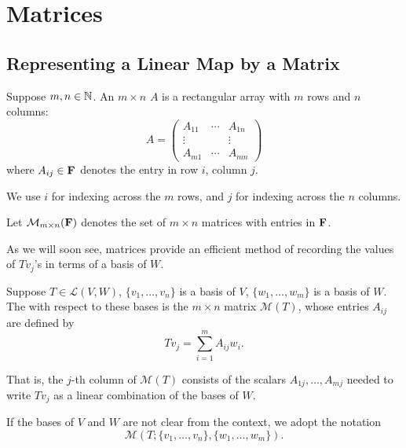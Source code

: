 \section{Matrices}
\subsection{Representing a Linear Map by a Matrix}
\begin{definition}[Matrix]
Suppose $m,n\in\mathbb N$. An $m\times n$  $A$ is a rectangular array with $m$ rows and $n$ columns:
\[A=\begin{pmatrix}
A_{11} & \cdots & A_{1n}\\
\vdots & & \vdots\\
A_{m1} & \cdots & A_{mn}
\end{pmatrix}\]
where $A_{ij}\in\mathbf F$ denotes the entry in row $i$, column $j$.
\end{definition}

\begin{notation}
We use $i$ for indexing across the $m$ rows, and $j$ for indexing across the $n$ columns.
\end{notation}

Let $\mathcal{M}_{m\times n}(\mathbf F)$ denotes the set of $m\times n$ matrices with entries in $\mathbf F$.

As we will soon see, matrices provide an efficient method of recording the values of $Tv_j$'s in terms of a basis of $W$.

\begin{definition}
Suppose $T\in\mathcal{L}(V,W)$, $\{v_1,\dots,v_n\}$ is a basis of $V$, $\{w_1,\dots,w_m\}$ is a basis of $W$. The  with respect to these bases is the $m\times n$ matrix $\mathcal{M}(T)$, whose entries $A_{ij}$ are defined by
\[Tv_j=\sum_{i=1}^{m}A_{ij}w_i.\]
\end{definition}

That is, the $j$-th column of $\mathcal{M}(T)$ consists of the scalars $A_{1j},\dots,A_{mj}$ needed to write $Tv_j$ as a linear combination of the bases of $W$.

\begin{notation}
If the bases of $V$ and $W$ are not clear from the context, we adopt the notation
\[\mathcal{M}(T;\{v_1,\dots,v_n\},\{w_1,\dots,w_m\}).\]
\end{notation}


